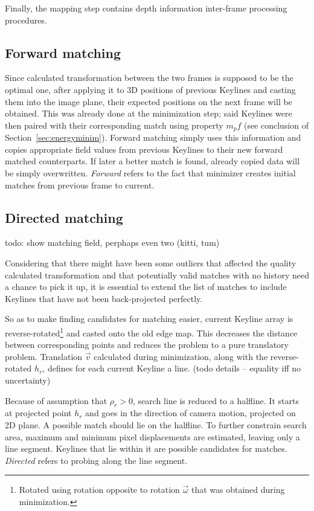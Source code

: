 Finally, the mapping step contains depth information inter-frame processing procedures.

\subsection{Forward matching}


Since calculated transformation between the two frames is supposed to be the optimal one, after applying it to 3D positions of previous Keylines and casting them into the image plane, their expected positions on the next frame will be obtained. This was already done at the minimization step; said Keylines were then paired with their corresponding match using property $m_pf$ (see conclusion of Section~\ref{sec:energyminim}). Forward matching simply uses this information and copies appropriate field values from previous Keylines to their new forward matched counterparts. If later a better match is found, already copied data will be simply overwritten. \textit{Forward} refers to the fact that minimizer creates initial matches from previous frame to current.

\subsection{Directed matching}

todo: show matching field, perphaps even two (kitti, tum)

Considering that there might have been some outliers that affected the quality calculated transformation and that potentially valid matches with no history need a chance to pick it up, it is essential to extend the list of matches to include Keylines that have not been back-projected perfectly.

So as to make finding candidates for matching easier, current Keyline array is reverse-rotated\footnote{Rotated using rotation opposite to rotation $\vec{\omega}$ that was obtained during minimization.} and casted onto the old edge map. This decreases the distance between corresponding points and reduces the problem to a pure translatory problem. Translation $\vec{v}$ calculated during minimization, along with the reverse-rotated $h_r$, defines for each current Keyline a line. (todo details -- equality iff no uncertainty)

Because of assumption that $\rho_r > 0$, search line is reduced to a halfline. It starts at projected point $h_r$ and goes in the direction of camera motion, projected on 2D plane. A possible match should lie on the halfline. To further constrain search area, maximum and minimum pixel displacements are estimated, leaving only a line segment. Keylines that lie within it are possible candidates for matches.  \textit{Directed} refers to probing along the line segment.

